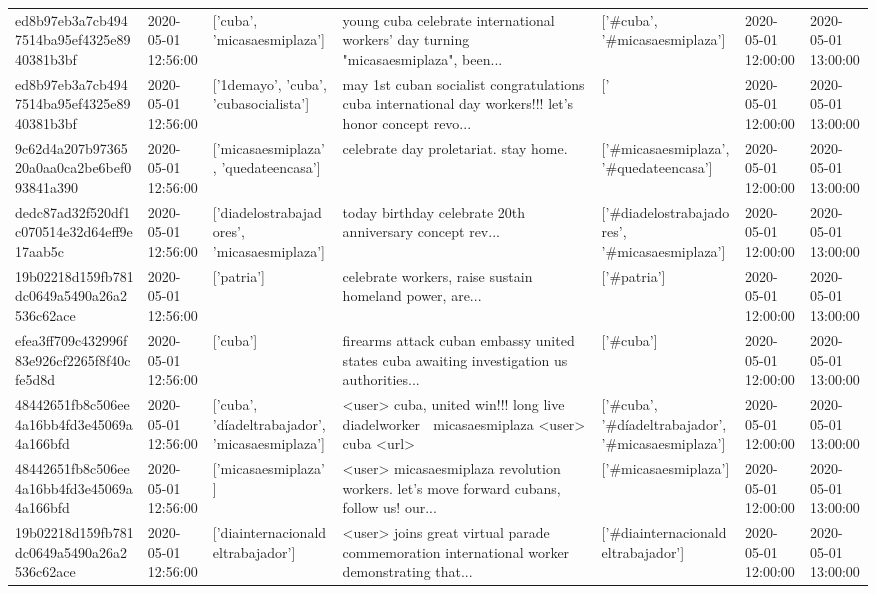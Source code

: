 \begin{tabular}{lllllll}
ed8b97eb3a7cb4947514ba95ef4325e8940381b3bf & 2020-05-01 12:56:00 & ['cuba', 'micasaesmiplaza'] & young cuba celebrate international workers' day turning "micasaesmiplaza", been... & ['#cuba', '#micasaesmiplaza'] & 2020-05-01 12:00:00 & 2020-05-01 13:00:00 \\
ed8b97eb3a7cb4947514ba95ef4325e8940381b3bf & 2020-05-01 12:56:00 & ['1demayo', 'cuba', 'cubasocialista'] & may 1st cuban socialist congratulations cuba international day workers!!! let's honor concept revo... & ['#1demayo', '#cuba', '#cubasocialista'] & 2020-05-01 12:00:00 & 2020-05-01 13:00:00 \\
9c62d4a207b9736520a0aa0ca2be6bef093841a390 & 2020-05-01 12:56:00 & ['micasaesmiplaza', 'quedateencasa'] & celebrate day proletariat. stay home. & ['#micasaesmiplaza', '#quedateencasa'] & 2020-05-01 12:00:00 & 2020-05-01 13:00:00 \\
dedc87ad32f520df1c070514e32d64eff9e17aab5c & 2020-05-01 12:56:00 & ['diadelostrabajadores', 'micasaesmiplaza'] & today birthday celebrate 20th anniversary concept rev... & ['#diadelostrabajadores', '#micasaesmiplaza'] & 2020-05-01 12:00:00 & 2020-05-01 13:00:00 \\
19b02218d159fb781dc0649a5490a26a2536c62ace & 2020-05-01 12:56:00 & ['patria'] & celebrate workers, raise sustain homeland power, are... & ['#patria'] & 2020-05-01 12:00:00 & 2020-05-01 13:00:00 \\
efea3ff709c432996f83e926cf2265f8f40cfe5d8d & 2020-05-01 12:56:00 & ['cuba'] & firearms attack cuban embassy united states cuba awaiting investigation us authorities... & ['#cuba'] & 2020-05-01 12:00:00 & 2020-05-01 13:00:00 \\
48442651fb8c506ee4a16bb4fd3e45069a4a166bfd & 2020-05-01 12:56:00 & ['cuba', 'díadeltrabajador', 'micasaesmiplaza'] & <user> cuba, united win!!! long live diadelworker 🤗 micasaesmiplaza <user> cuba <url> & ['#cuba', '#díadeltrabajador', '#micasaesmiplaza'] & 2020-05-01 12:00:00 & 2020-05-01 13:00:00 \\
48442651fb8c506ee4a16bb4fd3e45069a4a166bfd & 2020-05-01 12:56:00 & ['micasaesmiplaza'] & <user> micasaesmiplaza revolution workers. let's move forward cubans, follow us! our... & ['#micasaesmiplaza'] & 2020-05-01 12:00:00 & 2020-05-01 13:00:00 \\
19b02218d159fb781dc0649a5490a26a2536c62ace & 2020-05-01 12:56:00 & ['diainternacionaldeltrabajador'] & <user> joins great virtual parade commemoration international worker demonstrating that... & ['#diainternacionaldeltrabajador'] & 2020-05-01 12:00:00 & 2020-05-01 13:00:00 \\

\end{tabular}
